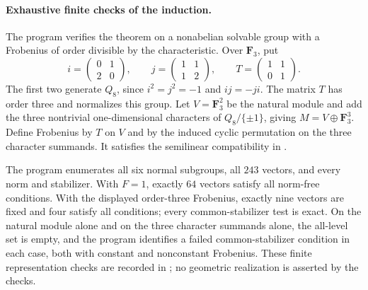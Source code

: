 \paragraph{Exhaustive finite checks of the induction.}
The program  verifies the
theorem on a nonabelian solvable group with a Frobenius of order
divisible by the characteristic. Over $\mathbf F_3$, put
\[
 i=\begin{pmatrix}0&1\\2&0\end{pmatrix},\qquad
 j=\begin{pmatrix}1&1\\1&2\end{pmatrix},\qquad
 T=\begin{pmatrix}1&1\\0&1\end{pmatrix}.
\]
The first two generate $Q_8$, since $i^2=j^2=-1$ and
$ij=-ji$. The matrix $T$ has order three and normalizes this
group. Let $V=\mathbf F_3^2$ be the natural module and add
the three nontrivial one-dimensional characters of
$Q_8/\{\pm1\}$, giving $M=V\oplus\mathbf F_3^3$.
Define Frobenius by $T$ on $V$ and by the induced cyclic
permutation on the three character summands. It satisfies
the semilinear compatibility in .

The program enumerates all six normal subgroups, all $243$
vectors, and every norm and stabilizer. With $F=1$, exactly
$64$ vectors satisfy all norm-free conditions. With the
displayed order-three Frobenius, exactly nine vectors are
fixed and four satisfy all conditions; every common-stabilizer
test is exact. On the natural module alone and on the three
character summands alone, the all-level set is empty, and
the program identifies a failed common-stabilizer condition
in each case, both with constant and nonconstant Frobenius.
These finite representation checks are recorded in
; no geometric
realization is asserted by the checks.
